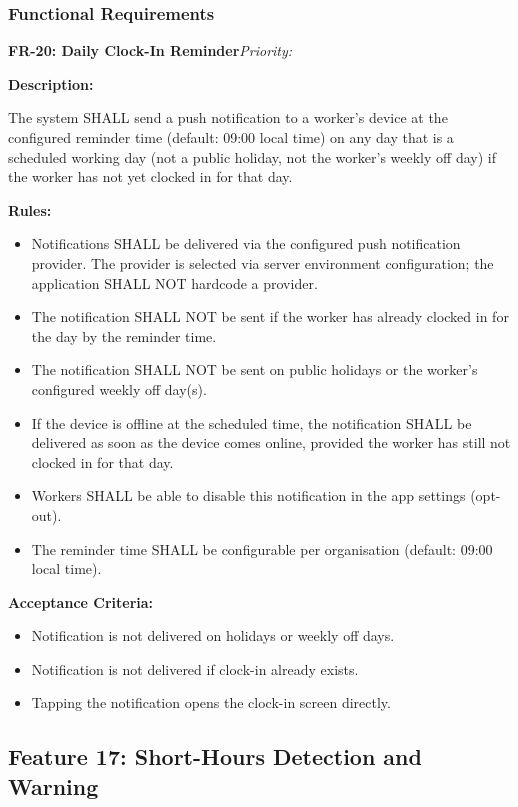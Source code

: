 \documentclass[12pt, a4paper]{article}
\newcommand{\frblock}[2]{%
    \noindent\textbf{#1}\hfill\textit{Priority: #2}%
    \par\smallskip%
}
\newcommand{\srsfield}[1]{\noindent\textbf{#1:}\par}
\begin{document}
\subsubsection*{Functional Requirements}

\frblock{FR-20: Daily Clock-In Reminder}{}

\srsfield{Description}
The system SHALL send a push notification to a worker's device at the
configured reminder time (default: 09:00 local time) on any day that is
a scheduled working day (not a public holiday, not the worker's weekly
off day) if the worker has not yet clocked in for that day.

\srsfield{Rules}
\begin{itemize}
    \item Notifications SHALL be delivered via the configured push
          notification provider. The provider is selected via server
          environment configuration; the application SHALL NOT hardcode
          a provider.
    \item The notification SHALL NOT be sent if the worker has already
          clocked in for the day by the reminder time.
    \item The notification SHALL NOT be sent on public holidays or the
          worker's configured weekly off day(s).
    \item If the device is offline at the scheduled time, the
          notification SHALL be delivered as soon as the device comes
          online, provided the worker has still not clocked in for that
          day.
    \item Workers SHALL be able to disable this notification in the app
          settings (opt-out).
    \item The reminder time SHALL be configurable per organisation
          (default: 09:00 local time).
\end{itemize}

\srsfield{Acceptance Criteria}
\begin{itemize}
    \item Notification is not delivered on holidays or weekly off days.
    \item Notification is not delivered if clock-in already exists.
    \item Tapping the notification opens the clock-in screen directly.
\end{itemize}

\subsection{Feature 17: Short-Hours Detection and Warning}
\end{document}
